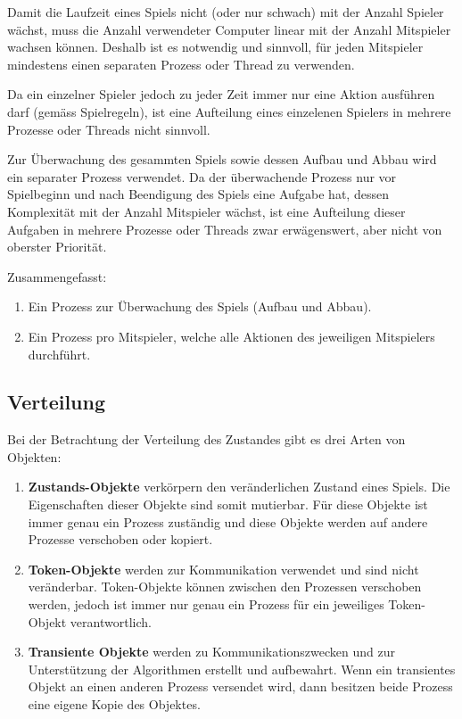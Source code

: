 
Damit die Laufzeit eines Spiels nicht (oder nur schwach) mit der Anzahl Spieler wächst, muss die Anzahl verwendeter Computer linear mit der Anzahl Mitspieler wachsen können. Deshalb ist es notwendig und sinnvoll, für jeden Mitspieler mindestens einen separaten Prozess oder Thread zu verwenden.

Da ein einzelner Spieler jedoch zu jeder Zeit immer nur eine Aktion ausführen darf (gemäss Spielregeln), ist eine Aufteilung eines einzelenen Spielers in mehrere Prozesse oder Threads nicht sinnvoll.

Zur Überwachung des gesammten Spiels sowie dessen Aufbau und Abbau wird ein separater Prozess verwendet. Da der überwachende Prozess nur vor Spielbeginn und nach Beendigung des Spiels eine Aufgabe hat, dessen Komplexität mit der Anzahl Mitspieler wächst, ist eine Aufteilung dieser Aufgaben in mehrere Prozesse oder Threads zwar erwägenswert, aber nicht von oberster Priorität.


\newpage

Zusammengefasst:

\begin{enumerate}
	\item Ein Prozess zur Überwachung des Spiels (Aufbau und Abbau).
	\item Ein Prozess pro Mitspieler, welche alle Aktionen des jeweiligen Mitspielers durchführt.
\end{enumerate}


\subsection{Verteilung}


Bei der Betrachtung der Verteilung des Zustandes gibt es drei Arten von Objekten:

\begin{enumerate}
	\item {\bf Zustands-Objekte} verkörpern den veränderlichen Zustand eines Spiels. Die Eigenschaften dieser Objekte sind somit mutierbar. Für diese Objekte ist immer genau ein Prozess zuständig und diese Objekte werden auf andere Prozesse verschoben oder kopiert.
	\item {\bf Token-Objekte} werden zur Kommunikation verwendet und sind nicht veränderbar. Token-Objekte können zwischen den Prozessen verschoben werden, jedoch ist immer nur genau ein Prozess für ein jeweiliges Token-Objekt verantwortlich.
	\item {\bf Transiente Objekte} werden zu Kommunikationszwecken und zur Unterstützung der Algorithmen erstellt und aufbewahrt. Wenn ein transientes Objekt an einen anderen Prozess versendet wird, dann besitzen beide Prozess eine eigene Kopie des Objektes.
\end{enumerate}

